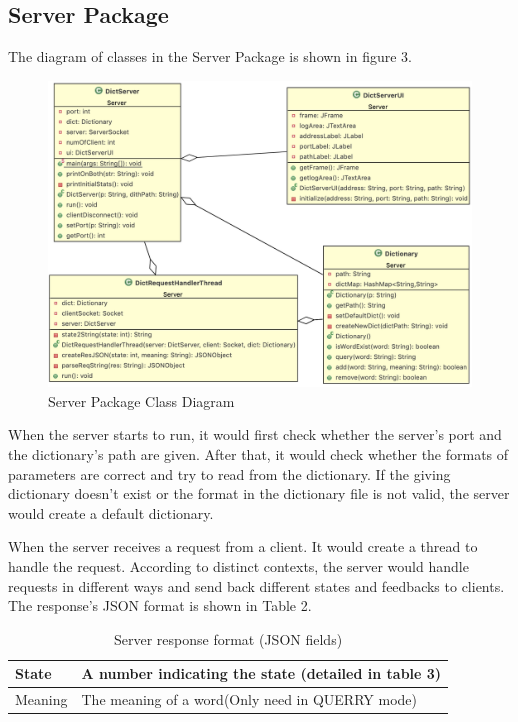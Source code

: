 \documentclass[a4paper]{article}
\begin{document}
\subsection{Server Package}
The diagram of classes in the Server Package is shown in figure 3.\\
\begin{figure}[H]
	\includegraphics[width=\linewidth]{ServerUML.png}
	\caption{Server Package Class Diagram}
\end{figure}

When the server starts to run, it would first check whether the server's port and the dictionary's path are given. After that, it would check whether the formats of parameters are correct and try to read from the dictionary. If the giving dictionary doesn't exist or the format in the dictionary file is not valid, the server would create a default dictionary.

When the server receives a request from a client. It would create a thread to handle the request. According to distinct contexts, the server would handle requests in different ways and send back different states and feedbacks to clients. The response's JSON format is shown in Table 2.

\begin{table}[H]
	\caption{Server response format (JSON fields)}
	\begin{tabular}{|p{1.3cm}|p{10cm}|}
		\hline
		State & A number indicating the state (detailed in table 3)                            \\ \hline
		Meaning & The meaning of a word(Only need in QUERRY mode)                               \\ \hline
	\end{tabular}
\end{table}
\end{document}
